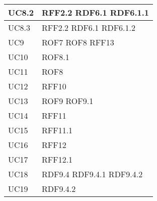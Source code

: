 \documentclass[../AnalisideiRequisiti.tex]{subfiles}
\begin{document}
\begin{longtable}{| p{4cm} | p{4cm} |}
		\hline
		\newline UC8.2 &  \newline RFF2.2 \newline RDF6.1 \newline RDF6.1.1 \\[1em]
		\hline
		\newline UC8.3 &  \newline RFF2.2 \newline RDF6.1 \newline RDF6.1.2 \\[1em]
		\hline
		\newline UC9 &  \newline ROF7 \newline ROF8 \newline RFF13 \\[1em]
		\hline
		\newline UC10 &  \newline ROF8.1 \\[1em]
		\hline
		\newline UC11 &  \newline ROF8 \\[1em]
		\hline
		\newline UC12 &  \newline RFF10 \\[1em]
		\hline
		\newline UC13 &  \newline ROF9 \newline ROF9.1 \\[1em]
		\hline
		\newline UC14 &  \newline RFF11 \\[1em]
		\hline
		\newline UC15 &  \newline RFF11.1 \\[1em]
		\hline
		\newline UC16 &  \newline RFF12 \\[1em]
		\hline
		\newline UC17 &  \newline RFF12.1 \\[1em]
		\hline
		\newline UC18 &  \newline RDF9.4 \newline RDF9.4.1 \newline RDF9.4.2 \\[1em]
		\hline
		\newline UC19 &  \newline RDF9.4.2 \\[1em]

\end{longtable}
\end{document}
